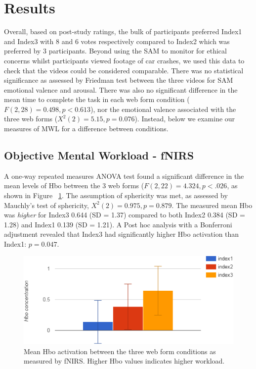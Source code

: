 \documentclass[../main/Feedback.tex]{subfiles}
\begin{document}
\section{Results}
Overall, based on post-study ratings, the bulk of participants preferred Index1 and Index3 with 8 and 6 votes respectively compared to Index2 which was preferred by 3 participants. Beyond using the SAM to monitor for ethical concerns whilst participants viewed footage of car crashes, we used this data to check that the videos could be considered comparable. 
There was no statistical significance as assessed by Friedman test between the three videos for SAM emotional valence and arousal.
There was also no significant difference in the mean time to complete the task in each web form condition ($F(2,28)=0.498, p<0.613$), nor the emotional valence associated with the three web forms ($X^{2}(2)=5.15, p=0.076$). 
Instead, below we examine our measures of MWL for a difference between conditions.
\subsection{Objective Mental Workload - fNIRS}
A one-way repeated measures ANOVA test found a significant difference in the mean levels of Hbo between the 3 web forms ($F(2,22)=4.324, p<.026$, as shown in Figure ~\ref{fig:mean-hbo-index123}. 
The assumption of sphericity was met, as assessed by Mauchly's test of sphericity, $X^{2}(2)=0.975, p=0.879$. 
The measured mean Hbo was \textit{higher} for Index3 0.644 (SD = 1.37) compared to both Index2 0.384 (SD = 1.28) and Index1 0.139 (SD = 1.21). 
A Post hoc analysis with a Bonferroni adjustment revealed that Index3 had significantly higher Hbo activation than Index1: $p=0.047$.

\begin{figure}[h]
	\centering
	\includegraphics[width=1\linewidth]{../figures/mean-Hbo-concentration-index123}
	\caption[mean Hbo activation between the three web forms]{Mean Hbo activation between the three web form conditions as measured by fNIRS. Higher Hbo values indicates higher workload.}
	\label{fig:mean-hbo-index123}
\end{figure}
		
\end{document}
